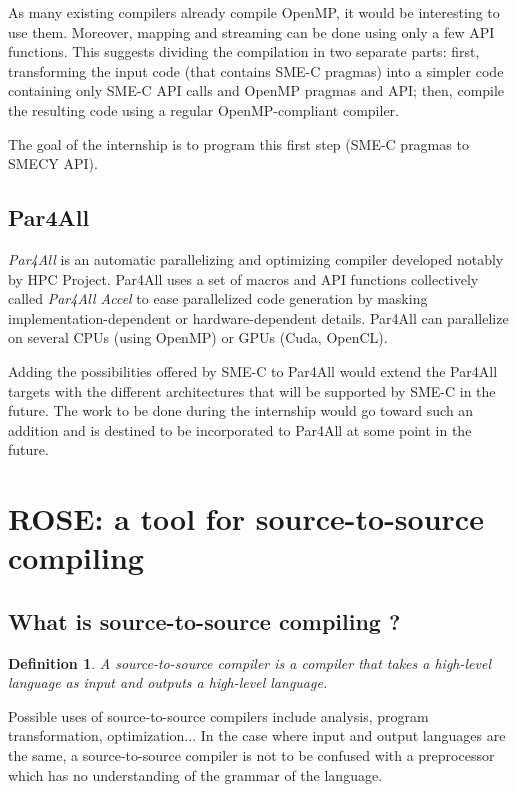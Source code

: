 \documentclass [A4]{article}
\newtheorem{defdef}{Definition}
\begin{document}
	As many existing compilers already compile OpenMP, it would be interesting to use them. Moreover, mapping and streaming can be done using only a few API functions. This suggests dividing the compilation in two separate parts: first, transforming the input code (that contains SME-C pragmas) into a simpler code containing only SME-C API calls and OpenMP pragmas and API; then, compile the resulting code using a regular OpenMP-compliant compiler.

	The goal of the internship is to program this first step (SME-C pragmas to SMECY API).
	
	\subsection{Par4All}
	\emph{Par4All} is an automatic parallelizing and optimizing compiler developed notably by HPC Project. Par4All uses a set of macros and API functions collectively called \emph{Par4All Accel} to ease parallelized code generation by masking implementation-dependent or hardware-dependent details. Par4All can parallelize on several CPUs (using OpenMP) or GPUs (Cuda, OpenCL).
	
	Adding the possibilities offered by SME-C to Par4All would extend the Par4All targets with the different architectures that will be supported by SME-C in the future. The work to be done during the internship would go toward such an addition and is destined to be incorporated to Par4All at some point in the future.

\section{ROSE: a tool for source-to-source compiling}
	\subsection{What is source-to-source compiling ?}
	\begin{defdef}A \emph{source-to-source compiler} is a compiler that takes a high-level language as input and outputs a high-level language.
	\end{defdef}
	
	Possible uses of source-to-source compilers include analysis, program transformation, optimization... In the case where input and output languages are the same, a source-to-source compiler is not to be confused with a preprocessor which has no understanding of the grammar of the language.
	
\end{document}
